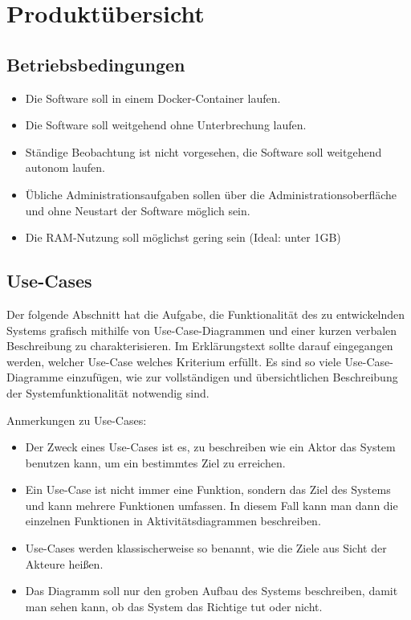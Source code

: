
\chapter{Produktübersicht}
\label{chap:product_overview}

\section{Betriebsbedingungen}
\begin{itemize}
    \item Die Software soll in einem \gls{Docker}-\gls{Container} laufen.
    \item Die Software soll weitgehend ohne Unterbrechung laufen.
    \item Ständige Beobachtung ist nicht vorgesehen, die Software soll weitgehend autonom laufen.
    \item Übliche Administrationsaufgaben sollen über die Administrationsoberfläche und ohne Neustart der Software möglich sein.
    \item Die \gls{RAM}-Nutzung soll möglichst gering sein (Ideal: unter 1GB)
\end{itemize}

\section{Use-Cases}

Der folgende Abschnitt hat die Aufgabe, die Funktionalität des zu entwickelnden Systems grafisch mithilfe von Use-Case-Diagrammen und einer kurzen verbalen
Beschreibung zu charakterisieren.
Im Erklärungstext sollte darauf eingegangen werden, welcher Use-Case welches Kriterium erfüllt.
Es sind so viele Use-Case-Diagramme einzufügen, wie zur vollständigen und übersichtlichen Beschreibung der Systemfunktionalität notwendig sind.

Anmerkungen zu Use-Cases:

\begin{itemize}
	\item Der Zweck eines Use-Cases ist es, zu beschreiben wie ein Aktor das System benutzen kann, um ein bestimmtes Ziel zu erreichen.
	\item Ein Use-Case ist nicht immer eine Funktion, sondern das Ziel des Systems und kann mehrere Funktionen umfassen.
		In diesem Fall kann man dann die einzelnen Funktionen in Aktivitätsdiagrammen beschreiben.
	\item Use-Cases werden klassischerweise so benannt, wie die Ziele aus Sicht der Akteure heißen.
	\item Das Diagramm soll nur den groben Aufbau des Systems beschreiben, damit man sehen kann, ob das System das Richtige tut oder nicht.
\end{itemize}


